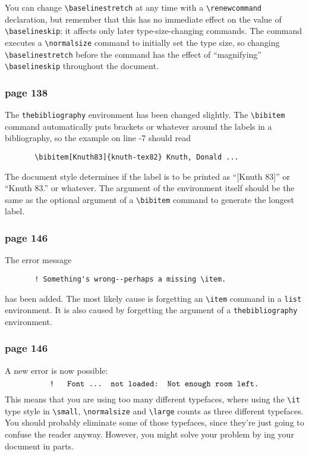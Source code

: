 You can change \hbox{\verb"\baselinestretch"} at any time with a
\hbox{\verb"\renewcommand"} declaration, but remember that this has no
immediate effect on the value of \hbox{\verb"\baselineskip"}; it 
affects only later type-size-changing commands.  The 
\linebreak
\hbox{\verb""} command executes a
\hbox{\verb"\normalsize"} command to initially set the type size, so
changing \hbox{\verb"\baselinestretch"} before the
\hbox{\verb""} command has the effect of
``magnifying'' \hbox{\verb"\baselineskip"} throughout the document.


\subsubsection*{page 138}
The \hbox{\tt thebibliography} environment has been changed slightly.
The \verb"\bibitem" command automatically puts brackets or whatever
around the labels in a bibliography, so the example on line -7 should
read
\begin{verbatim}
       \bibitem[Knuth83]{knuth-tex82} Knuth, Donald ...
\end{verbatim}
The document style determines if the label is to be printed as
``[Knuth 83]'' or ``Knuth 83.'' or whatever.  The argument of
the environment itself should be the same as
the optional argument of a \hbox{\verb"\bibitem"} command to generate the
longest label.


\subsubsection*{page 146}
The error message 
\begin{verbatim}
       ! Something's wrong--perhaps a missing \item.
\end{verbatim}
has been added.  The most likely cause is forgetting an
\hbox{\verb|\item|} command in a {\tt list} environment.  It is also
caused by forgetting the argument of a \hbox{\tt thebibliography}
environment.

\subsubsection*{page 146}
A new \TEX{} error is now possible:
\[ \mbox{\tt ! \ Font ... not loaded: Not enough room left.} \]
This means that you are using too many different typefaces, where
using the \hbox{\verb"\it"} type style in \hbox{\verb"\small"},
\hbox{\verb"\normalsize"} and \hbox{\verb"\large"} counts as three
different typefaces.  You should probably eliminate some of those
typefaces, since they're just going to confuse the reader anyway.
However, you might solve your problem by \LATEX{}ing your
document in parts.


